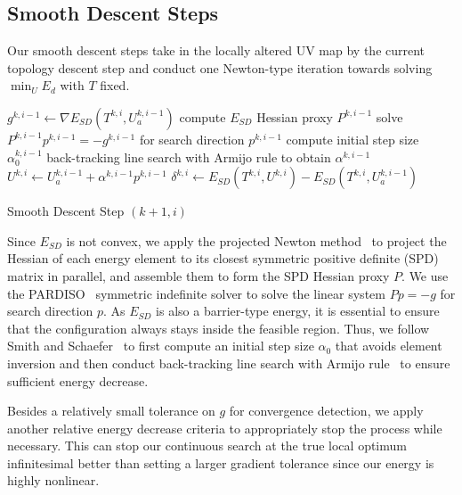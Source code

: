 
\subsection{Smooth Descent Steps}
\label{sec:descentStep}

Our smooth descent steps take in the locally altered UV map by the current topology descent step and conduct one Newton-type iteration towards solving $\min_U E_d$ with $T$ fixed.

\begin{algorithm}[h]
\SetAlgoLined
{}
$g^{k,i-1} \leftarrow \nabla E_{SD}(T^{k,i}, U_a^{k,i-1})$\;
compute $E_{SD}$ Hessian proxy $P^{k,i-1}$\;
solve $P^{k,i-1} p^{k,i-1} = -g^{k,i-1}$ for search direction $p^{k,i-1}$\;
compute initial step size $\alpha^{k,i-1}_0$\;
back-tracking line search with Armijo rule to obtain $\alpha^{k,i-1}$\;
$U^{k,i} \leftarrow U_a^{k,i-1} + \alpha^{k,i-1} p^{k,i-1}$\;
$\delta^{k,i} \leftarrow E_{SD}(T^{k,i}, U^{k,i}) - E_{SD}(T^{k,i}, U_a^{k,i-1})$\;
\caption{Smooth Descent Step $(k+1,i)$}
\label{alg:descentStep}
\end{algorithm}
Since $E_{SD}$ is not convex, we apply the projected Newton method~\cite{Teran2005Robust} to project the Hessian of each energy element to its closest symmetric positive definite (SPD) matrix in parallel, and assemble them to form the SPD Hessian proxy $P$. We use the PARDISO~\cite{pardiso-6.0a, pardiso-6.0b} symmetric indefinite solver to solve the linear system $P p = -g$ for search direction $p$.  As $E_{SD}$ is also a barrier-type energy, it is essential to ensure that the configuration always stays inside the feasible region. Thus, we follow Smith and Schaefer~ to first compute an initial step size $\alpha_0$ that avoids element inversion and then conduct back-tracking line search with Armijo rule~\cite{Armijo1966Minimization} to ensure sufficient energy decrease.

Besides a relatively small tolerance on $g$ for convergence detection, we apply another relative energy decrease criteria to appropriately stop the process while necessary.
This can stop our continuous search at the true local optimum infinitesimal better than setting a larger gradient tolerance since our energy is highly nonlinear.

